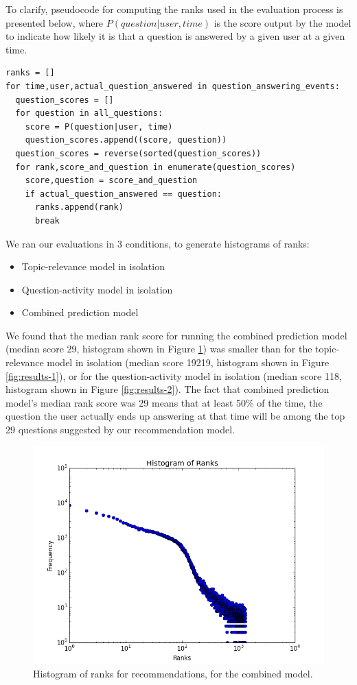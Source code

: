 \documentclass[a4paper]{article}
\begin{document}
To clarify, pseudocode for computing the ranks used in the evaluation process is presented below, where $P(question|user, time)$ is the score output by the model to indicate how likely it is that a question is answered by a given user at a given time.

\begin{verbatim}
ranks = []
for time,user,actual_question_answered in question_answering_events:
  question_scores = []
  for question in all_questions:
    score = P(question|user, time)
    question_scores.append((score, question))
  question_scores = reverse(sorted(question_scores))
  for rank,score_and_question in enumerate(question_scores)
    score,question = score_and_question
    if actual_question_answered == question:
      ranks.append(rank)
      break
\end{verbatim}

We ran our evaluations in 3 conditions, to generate histograms of ranks:

\begin{itemize}
\item Topic-relevance model in isolation
\item Question-activity model in isolation
\item Combined prediction model
\end{itemize}

We found that the median rank score for running the combined prediction model (median score 29, histogram shown in Figure \ref{fig:results-0}) was smaller than for the topic-relevance model in isolation (median score 19219, histogram shown in Figure \ref{fig:results-1}), or for the question-activity model in isolation (median score 118, histogram shown in Figure \ref{fig:results-2}). The fact that combined prediction model's median rank score was 29 means that at least 50\% of the time, the question the user actually ends up answering at that time will be among the top 29 questions suggested by our recommendation model.

\begin{figure}
\centering
\includegraphics[width=\columnwidth]{results-0}
\caption{Histogram of ranks for recommendations, for the combined model.}
\label{fig:results-0}
\end{figure}
\end{document}
